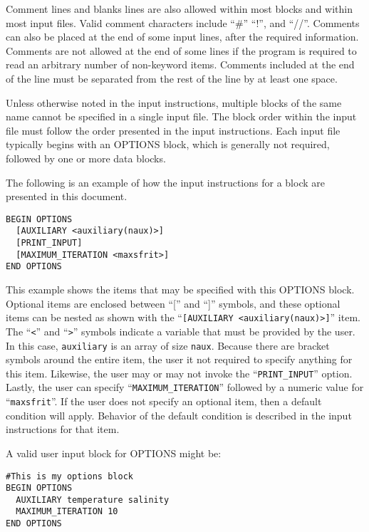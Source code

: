 Comment lines and blanks lines are also allowed within most blocks and within most input files.  Valid comment characters include ``\#'' ``!'', and ``//''.  Comments can also be placed at the end of some input lines, after the required information.  Comments are not allowed at the end of some lines if the program is required to read an arbitrary number of non-keyword items.  Comments included at the end of the line must be separated from the rest of the line by at least one space.

Unless otherwise noted in the input instructions, multiple blocks of the same name cannot be specified in a single input file.  The block order within the input file must follow the order presented in the input instructions.  Each input file typically begins with an OPTIONS block, which is generally not required, followed by one or more data blocks.

The following is an example of how the input instructions for a block are presented in this document.  
\begin{lstlisting}[style=blockdefinition]
BEGIN OPTIONS
  [AUXILIARY <auxiliary(naux)>]
  [PRINT_INPUT]
  [MAXIMUM_ITERATION <maxsfrit>]
END OPTIONS
\end{lstlisting}
This example shows the items that may be specified with this OPTIONS block.  Optional items are enclosed between ``['' and ``]'' symbols, and these optional items can be nested as shown with the ``\texttt{[AUXILIARY <auxiliary(naux)>]}'' item.  The ``\texttt{<}'' and ``\texttt{>}'' symbols indicate a variable that must be provided by the user.  In this case, \texttt{auxiliary} is an array of size \texttt{naux}.  Because there are bracket symbols around the entire item, the user it not required to specify anything for this item.  Likewise, the user may or may not invoke the ``\texttt{PRINT\_INPUT}'' option.  Lastly, the user can specify ``\texttt{MAXIMUM\_ITERATION}'' followed by a numeric value for ``\texttt{maxsfrit}''.  If the user does not specify an optional item, then a default condition will apply.  Behavior of the default condition is described in the input instructions for that item.

\vspace{6pt}\noindent A valid user input block for OPTIONS might be:

\begin{lstlisting}[style=inputfile]
#This is my options block
BEGIN OPTIONS
  AUXILIARY temperature salinity
  MAXIMUM_ITERATION 10
END OPTIONS
\end{lstlisting}

